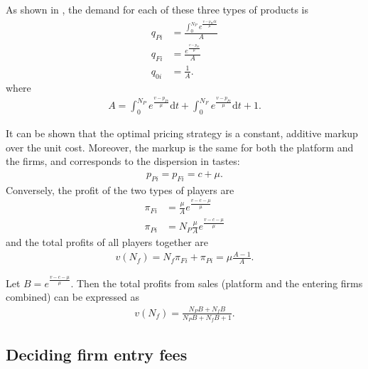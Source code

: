 \documentclass[a4paper]{article}
\newcommand{\dt}{\mathrm{d}t}
\newcommand{\di}{\mathrm{d}i}
\begin{document}
As shown in \textcite{anderson2021hybrid}, the demand for each of these three types of products is
\begin{align*}
    q_{Pi} &= \frac{\int_0^{N_P}  e^\frac{v - p_{Pi} \di}{\mu}}{A} \\
    q_{Fi} &= \frac{e^\frac{v - p_{Fi}}{\mu}}{A} \\
    q_{0i} &= \frac{1}{A} .
\end{align*}
where
\begin{align*}
    A = \int_0^{N_P} e^\frac{v - p_{Pi}}{\mu} \dt + \int_0^{N_F} e^\frac{v - p_{Fi}}{\mu} \dt + 1.
\end{align*}

It can be shown that the optimal pricing strategy is a constant, additive markup over the unit cost. Moreover, the markup is the same for both the platform and the firms, and corresponds to the dispersion in tastes:
\begin{align*}
    p_{Pi} = p_{Fi} = c + \mu.
\end{align*}
Conversely, the profit of the two types of players are
\begin{align*}
    \pi_{Fi} &= \frac{\mu}{A} e^\frac{v - c - \mu}{\mu} \\
    \pi_{Pi} &= N_P \frac{\mu}{A} e^\frac{v - c - \mu}{\mu}
\end{align*}
and the total profits of all players together are
\begin{align*}
    v(N_f) = N_f \pi_{Fi} + \pi_{Pi} = \mu \frac{A - 1}{A}.
\end{align*}

Let $B = e^\frac{v - c - \mu}{\mu}$. Then the total profits from sales (platform and the entering firms combined) can be expressed as
\begin{align*}
    v(N_f) = \frac{N_P B + N_f B}{N_P B + N_f B + 1}.
\end{align*}

\subsection{Deciding firm entry fees}
\end{document}
